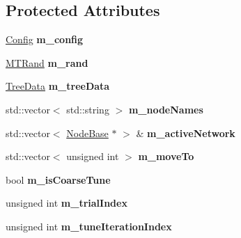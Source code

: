 \subsection*{Protected Attributes}
\begin{DoxyCompactItemize}
\item 
\mbox{\label{classInfomapBase_ad864fffe327deeff79a57f6f5c9a206e}} 
\mbox{\hyperlink{structConfig}{Config}} {\bfseries m\+\_\+config}
\item 
\mbox{\label{classInfomapBase_af26209a483326cbc9ceb3aaa203a5199}} 
\mbox{\hyperlink{classMTRand}{M\+T\+Rand}} {\bfseries m\+\_\+rand}
\item 
\mbox{\label{classInfomapBase_a4e325b3b37a623dbe5ce66e95bfddd3c}} 
\mbox{\hyperlink{classTreeData}{Tree\+Data}} {\bfseries m\+\_\+tree\+Data}
\item 
\mbox{\label{classInfomapBase_ac51c8b09b5c2cb8c36123845d474aab7}} 
std\+::vector$<$ std\+::string $>$ {\bfseries m\+\_\+node\+Names}
\item 
\mbox{\label{classInfomapBase_a3c9cf55bef3392f7a3ace0c38e407588}} 
std\+::vector$<$ \mbox{\hyperlink{classNodeBase}{Node\+Base}} $\ast$ $>$ \& {\bfseries m\+\_\+active\+Network}
\item 
\mbox{\label{classInfomapBase_a86d9e83a4d4089744113c84d3f2d5e98}} 
std\+::vector$<$ unsigned int $>$ {\bfseries m\+\_\+move\+To}
\item 
\mbox{\label{classInfomapBase_aef852877a7ecf8c88bd1b4fb22dd0cd2}} 
bool {\bfseries m\+\_\+is\+Coarse\+Tune}
\item 
\mbox{\label{classInfomapBase_a0f6004f65c7c000985643b5f74fe9ec7}} 
unsigned int {\bfseries m\+\_\+trial\+Index}
\item 
\mbox{\label{classInfomapBase_a66cec7b6ee5b864117f001acf2b2ba24}} 
unsigned int {\bfseries m\+\_\+tune\+Iteration\+Index}
\item 
\mbox{\label{classInfomapBase_a836bc7654d622f5ca119d45cbb5b72c3}} 

\end{DoxyCompactItemize}
